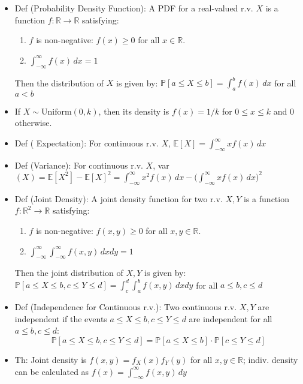 \documentclass{article}
\begin{document}
{\color{blue} }
\begin{itemize}
	\item Def (Probability Density Function): A PDF for a real-valued r.v. $X$ is a function $f:\mathbb{R}\rightarrow\mathbb{R}$ satisfying:
	\begin{enumerate}
		\item $f$ is non-negative: $f(x)\geq 0$ for all $x\in\mathbb{R}$.
		\item $\int_{-\infty}^{\infty} f(x)\, dx = 1$
	\end{enumerate}
	Then the distribution of $X$ is given by: $\mathbb{P}[a\leq X\leq b] = \int_a^b f(x)\, dx$ for all $a<b$
	\item If $X\sim\text{Uniform}(0, k)$, then its density is $f(x) = 1/k$ for $0\leq x\leq k$ and 0 otherwise.
	\item Def ({\color{red} Expectation}): For continuous r.v. $X$, $\mathbb{E}[X] = \int_{-\infty}^{\infty} xf(x)\, dx$
	\item Def (Variance): For continuous r.v. $X$, var$(X) = \mathbb{E}[X^2] - \mathbb{E}[X]^2 =
	\int_{-\infty}^{\infty} x^2f(x)\, dx - \Big(\int_{-\infty}^{\infty} xf(x)\, dx\Big)^2$
	\item Def (Joint Density): A joint density function for two r.v. $X,Y$ is a function $f:\mathbb{R}^2\rightarrow\mathbb{R}$ satisfying:
	\begin{enumerate}
		\item $f$ is non-negative: $f(x,y)\geq 0$ for all $x,y\in\mathbb{R}$.
		\item $\int_{-\infty}^{\infty}\int_{-\infty}^{\infty} f(x,y)\, dxdy = 1$
	\end{enumerate}
	Then the joint distribution of $X,Y$ is given by: $\mathbb{P}[a\leq X\leq b, c\leq Y\leq d] = \int_c^d\int_a^b f(x,y)\, dxdy$ for all $a\leq b, c\leq d$
	\item Def (Independence for Continuous r.v.): Two continuous r.v. $X,Y$ are independent if the events $a\leq X\leq b, c\leq Y\leq d$ are independent for all $a\leq b, c\leq d$:
	$$\mathbb{P}[a\leq X\leq b, c\leq Y\leq d] = \mathbb{P}[a\leq X\leq b]\cdot\mathbb{P}[c\leq Y\leq d]$$
	\item Th: Joint density is $f(x,y) = f_X(x)f_Y(y)$ for all $x,y\in\mathbb{R}$; indiv. density can be calculated as $f(x) = \int_{-\infty}^{\infty} f(x,y)\,dy$
	

\end{itemize}
\end{document}
